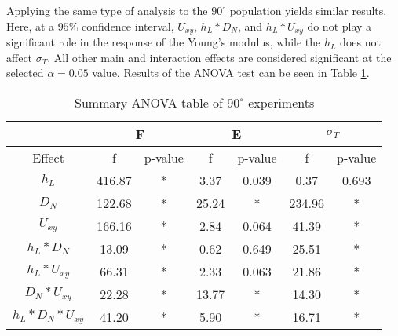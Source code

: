 \documentclass[main.tex]{subfiles}
\begin{document}
Applying the same type of analysis to the $90^{\circ}$ population yields similar results. Here, at a $95\%$ confidence interval, $U_{xy}$, $h_{L}*D_{N}$, and $h_{L}*U_{xy}$ do not play a significant role in the response of the Young's modulus, while the $h_{L}$ does not affect $\sigma_{T}$. All other main and interaction effects are considered significant at the selected $\alpha = 0.05$ value. Results of the ANOVA test can be seen in Table \ref{tab:anova_90}.

\begin{table}[]
	\renewcommand{\arraystretch}{1.5}
	\centering
	\caption{Summary ANOVA table of $90^{\circ}$ experiments}
	\label{tab:anova_90}
	\begin{tabular}{ccccccc}
		\hline
		& \multicolumn{2}{c}{F}                 & \multicolumn{2}{c}{E}                & \multicolumn{2}{c}{$\sigma_{T}$} \\ \hline
		\multicolumn{1}{c|}{Effect}        & f      & \multicolumn{1}{c|}{p-value} & f     & \multicolumn{1}{c|}{p-value} & f              & p-value         \\
		\multicolumn{1}{c|}{$h_{L}$}            & 416.87 & \multicolumn{1}{c|}{*}       & 3.37  & \multicolumn{1}{c|}{0.039}   & 0.37           & 0.693           \\
		\multicolumn{1}{c|}{$D_{N}$}       & 122.68 & \multicolumn{1}{c|}{*}       & 25.24 & \multicolumn{1}{c|}{*}       & 234.96         & *               \\
		\multicolumn{1}{c|}{$U_{xy}$}            & 166.16 & \multicolumn{1}{c|}{*}       & 2.84  & \multicolumn{1}{c|}{0.064}   & 41.39          & *               \\
		\multicolumn{1}{c|}{$h_{L}*D_{N}$}    & 13.09  & \multicolumn{1}{c|}{*}       & 0.62  & \multicolumn{1}{c|}{0.649}   & 25.51          & *               \\
		\multicolumn{1}{c|}{$h_{L}*U_{xy}$}       & 66.31  & \multicolumn{1}{c|}{*}       & 2.33  & \multicolumn{1}{c|}{0.063}   & 21.86          & *               \\
		\multicolumn{1}{c|}{$D_{N}*U_{xy}$}    & 22.28  & \multicolumn{1}{c|}{*}       & 13.77 & \multicolumn{1}{c|}{*}       & 14.30          & *               \\
		\multicolumn{1}{c|}{$h_{L}*D_{N}*U_{xy}$} & 41.20  & \multicolumn{1}{c|}{*}       & 5.90  & \multicolumn{1}{c|}{*}       & 16.71          & *               \\ \hline
	\end{tabular}
\end{table} 
\end{document}
